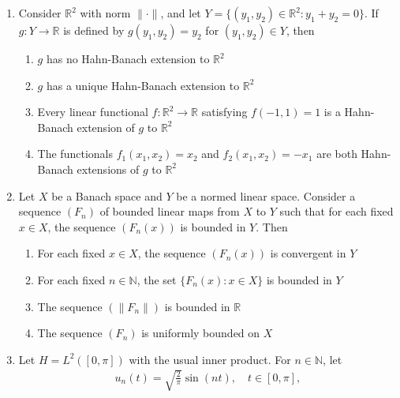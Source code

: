 \documentclass[journal]{IEEEtran}
\numberwithin{equation}{enumi}
\numberwithin{figure}{enumi}
\begin{document}
\begin{enumerate}
Then the operator norm $\|T\|$ of $T$ is equal to
\hfill{}
\begin{multicols}{4}
\begin{enumerate}
    \item 6
    \item 7
    \item 8
    \item $\sqrt{42}$
\end{enumerate}
\end{multicols}

\item
Consider $\mathbb{R}^2$ with norm $\|\cdot\|$, and let $Y = \{(y_1,y_2) \in \mathbb{R}^2 : y_1 + y_2 = 0\}$. If $g : Y \to \mathbb{R}$ is defined by $g(y_1,y_2) = y_2$ for $(y_1,y_2) \in Y$, then
\hfill{}

\begin{enumerate}
    \item $g$ has no Hahn-Banach extension to $\mathbb{R}^2$
    \item $g$ has a unique Hahn-Banach extension to $\mathbb{R}^2$
    \item Every linear functional $f : \mathbb{R}^2 \to \mathbb{R}$ satisfying $f(-1,1) = 1$ is a Hahn-Banach extension of $g$ to $\mathbb{R}^2$
    \item The functionals $f_1(x_1,x_2) = x_2$ and $f_2(x_1,x_2) = -x_1$ are both Hahn-Banach extensions of $g$ to $\mathbb{R}^2$
\end{enumerate}


\item
Let $X$ be a Banach space and $Y$ be a normed linear space. Consider a sequence $(F_n)$ of bounded linear maps from $X$ to $Y$ such that for each fixed $x \in X$, the sequence $(F_n(x))$ is bounded in $Y$. Then
\hfill{}

\begin{enumerate}
    \item For each fixed $x \in X$, the sequence $(F_n(x))$ is convergent in $Y$
    \item For each fixed $n \in \mathbb{N}$, the set $\{F_n(x) : x \in X \}$ is bounded in $Y$
    \item The sequence $(\|F_n\|)$ is bounded in $\mathbb{R}$
    \item The sequence $(F_n)$ is uniformly bounded on $X$
\end{enumerate}

\item
Let $H = L^2([0, \pi])$ with the usual inner product. For $n \in \mathbb{N}$, let
\begin{align}
    u_n(t) = \sqrt{\frac{2}{\pi}} \sin(n t), \quad t \in [0, \pi],
\end{align}


\end{enumerate}
\end{document}
